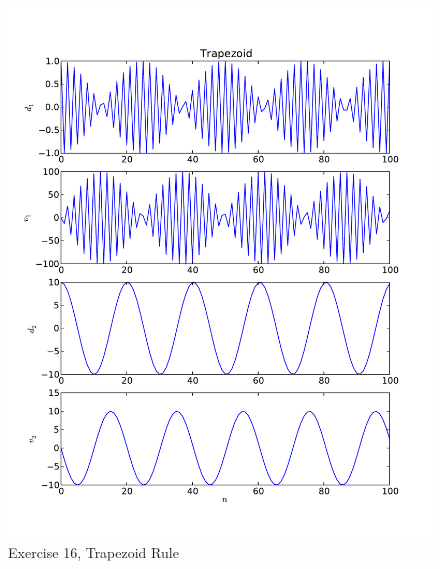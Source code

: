 \documentclass[12pt]{article}
\begin{document}
\begin{figure}[h!]
\centering
\includegraphics[height=0.9\textheight]{t1.pdf}
\caption{Exercise 16, Trapezoid Rule}
\end{figure}
\end{document}
